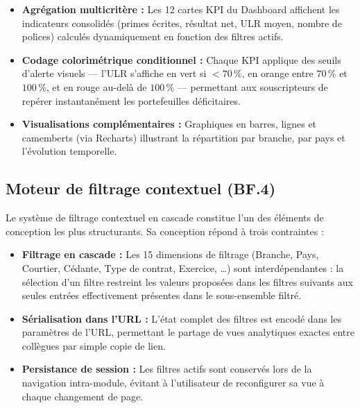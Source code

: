 \documentclass[12pt,a4paper]{report}
\begin{document}
\begin{itemize}[leftmargin=1.5cm, itemsep=3pt]
  \item \textbf{Agrégation multicritère :} Les 12 cartes KPI du Dashboard affichent les indicateurs consolidés (primes écrites, résultat net, ULR moyen, nombre de polices) calculés dynamiquement en fonction des filtres actifs.
  \item \textbf{Codage colorimétrique conditionnel :} Chaque KPI applique des seuils d'alerte visuels --- l'ULR s'affiche en vert si $<70\,\%$, en orange entre $70\,\%$ et $100\,\%$, et en rouge au-delà de $100\,\%$ --- permettant aux souscripteurs de repérer instantanément les portefeuilles déficitaires.
  \item \textbf{Visualisations complémentaires :} Graphiques en barres, lignes et camemberts (via Recharts) illustrant la répartition par branche, par pays et l'évolution temporelle.
\end{itemize}

\subsection{Moteur de filtrage contextuel (BF.4)}

Le système de filtrage contextuel en cascade constitue l'un des éléments de conception les plus structurants. Sa conception répond à trois contraintes :

\begin{itemize}[leftmargin=1.5cm, itemsep=3pt]
  \item \textbf{Filtrage en cascade :} Les 15 dimensions de filtrage (Branche, Pays, Courtier, Cédante, Type de contrat, Exercice, \ldots) sont interdépendantes : la sélection d'un filtre restreint les valeurs proposées dans les filtres suivants aux seules entrées effectivement présentes dans le sous-ensemble filtré.
  \item \textbf{Sérialisation dans l'URL :} L'état complet des filtres est encodé dans les paramètres de l'URL, permettant le partage de vues analytiques exactes entre collègues par simple copie de lien.
  \item \textbf{Persistance de session :} Les filtres actifs sont conservés lors de la navigation intra-module, évitant à l'utilisateur de reconfigurer sa vue à chaque changement de page.
\end{itemize}
\end{document}
